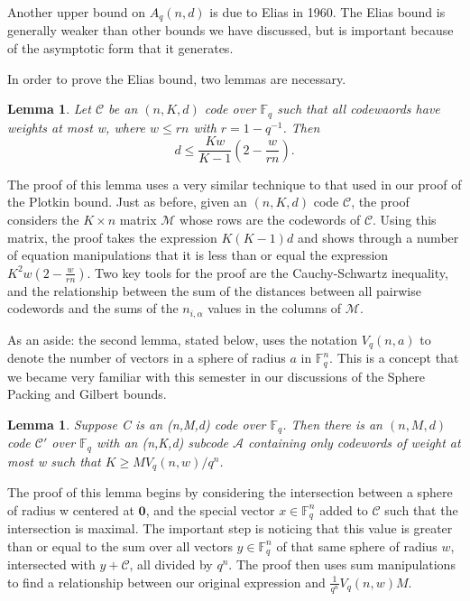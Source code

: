 \documentclass{article}
\theoremstyle{plain}
\newtheorem{lemma}[theorem]{Lemma}
\theoremstyle{definition}
\begin{document}
Another upper bound on $A_q(n,d)$ is due to Elias in 1960.  The Elias bound is generally weaker than other bounds we have discussed, but is important because of the asymptotic
form that it generates.

In order to prove the Elias bound, two lemmas are necessary.

\begin{lemma}
Let $\mathcal{C}$ be an $(n,K,d)$ code over $\mathbb{F}_q$ such that all codewaords have weights at most w, where $w \le rn$ with $r=1-q^{-1}$.  Then
\begin{equation}
d\le \frac{Kw}{K-1}\left(2- \frac{w}{rn}\right).
\end{equation}
\end{lemma}

The proof of this lemma uses a very similar technique to that used in our proof of the Plotkin bound. Just as before, given an $(n,K,d)$ code $\mathcal{C}$, the proof considers
the $K \times n$ matrix $\mathcal{M}$ whose rows are the codewords of $\mathcal{C}$.  Using this matrix, the proof takes the expression $K(K-1)d$ and shows through a number of equation manipulations
that it is less than or equal the expression $K^2 w\left( 2 - \frac{w}{rn}\right )$.  Two key tools for the proof are the Cauchy-Schwartz inequality, and the relationship between 
the sum of the distances between all pairwise codewords and the sums of the $n_{i,\alpha}$ values in the columns of $\mathcal{M}$.

As an aside: the second lemma, stated below, uses the notation $V_q(n,a)$ to denote the number of vectors in a sphere of radius $a$ in $\mathbb{F}_q^n$.  This is a concept 
that we became very familiar with this semester in our discussions of the Sphere Packing and Gilbert bounds.

\begin{lemma}
Suppose C is an (n,M,d) code over $\mathbb{F}_q$.  Then there is an $(n,M,d)$ code $\mathcal{C}'$ over $\mathbb{F}_q$ with an (n,K,d) subcode $\mathcal{A}$ containing
only codewords of weight at most w such that $K \ge M V_q(n,w) / q^n$.
\end{lemma}

The proof of this lemma begins by considering the intersection between a sphere of radius w centered at $\mathbf{0}$, and the special vector $x\in \mathbb{F}_q^n$ added to $\mathcal{C}$ such that the intersection
is maximal.  The important step is noticing that this value is greater than or equal to the sum over all vectors $y\in\mathbb{F}_q^n$ of that same sphere of radius $w$, intersected with 
$y+\mathcal{C}$, all divided by $q^n$.  The proof then uses sum manipulations to find a relationship between our original expression and $\frac{1}{q^n}V_q(n,w)M$.
\end{document}
